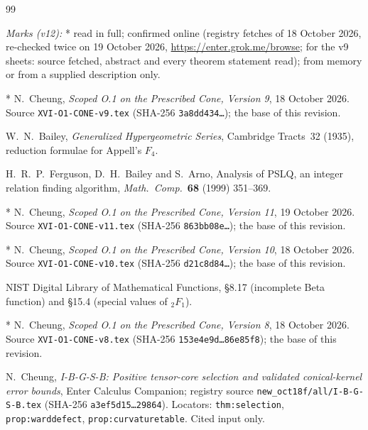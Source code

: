\documentclass[11pt,a4paper]{article}
\newcommand{\loc}[1]{\nolinkurl{#1}}
\theoremstyle{plain}
\theoremstyle{definition}
\theoremstyle{remark}
\numberwithin{equation}{section}
\begin{document}
\begin{thebibliography}{99}
\item[] \textit{Marks (v12):} * read in full; \ddag{} confirmed online
(registry fetches of 18 October 2026, re-checked twice on 19 October 2026, \url{https://enter.grok.me/browse};
for the v9 sheets: source fetched, abstract and every theorem statement read);
\dag{} from memory or from a supplied description only.

* N.~Cheung,
\emph{Scoped O.1 on the Prescribed Cone, Version 9},
18 October 2026. Source \loc{XVI-O1-CONE-v9.tex}
(SHA-256 \texttt{3a8dd434\ldots}); the base of this revision.

\dag{} W.~N.~Bailey, \emph{Generalized Hypergeometric Series},
Cambridge Tracts~32 (1935), reduction formulae for Appell's \(F_4\).

\dag{} H.~R.~P.~Ferguson, D.~H.~Bailey and S.~Arno,
Analysis of PSLQ, an integer relation finding algorithm,
\emph{Math.\ Comp.}\ \textbf{68} (1999) 351--369.

* N.~Cheung,
\emph{Scoped O.1 on the Prescribed Cone, Version 11},
19 October 2026. Source \loc{XVI-O1-CONE-v11.tex}
(SHA-256 \texttt{863bb08e\ldots}); the base of this revision.

* N.~Cheung,
\emph{Scoped O.1 on the Prescribed Cone, Version 10},
18 October 2026. Source \loc{XVI-O1-CONE-v10.tex}
(SHA-256 \texttt{d21c8d84\ldots}); the base of this revision.

\dag{} NIST Digital Library of Mathematical Functions, \S8.17
(incomplete Beta function) and \S15.4 (special values of \({}_2F_1\)).

* N.~Cheung,
\emph{Scoped O.1 on the Prescribed Cone, Version 8},
18 October 2026. Source \loc{XVI-O1-CONE-v8.tex}
(SHA-256 \texttt{153e4e9d\ldots86e85f8}); the base of this revision.

\ddag N.~Cheung,
\emph{I-B-G-S-B: Positive tensor-core selection and validated
conical-kernel error bounds},
Enter Calculus Companion; registry source \loc{new_oct18f/all/I-B-G-S-B.tex}
(SHA-256 \texttt{a3ef5d15\ldots29864}).
Locators: \loc{thm:selection}, \loc{prop:warddefect},
\loc{prop:curvaturetable}. Cited input only.


\end{thebibliography}
\end{document}
